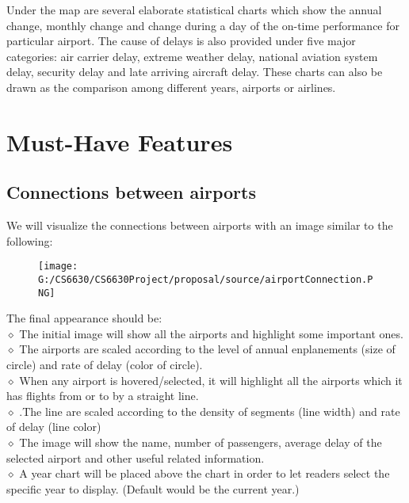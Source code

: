 \documentclass[12pt]{article}
\begin{document}
Under the map are several elaborate statistical charts which show the annual change, monthly change and change during a day of the on-time performance for particular airport. The cause of delays is also provided under five major categories: air carrier delay, extreme weather delay, national aviation system delay, security delay and late arriving aircraft delay. These charts can also be drawn as the comparison among different years, airports or airlines.

\section{Must-Have Features}
    \subsection{Connections between airports}
    We will visualize the connections between airports with an image similar to the following:
    \begin{figure}[H]
      \centering
      \texttt{[image: G:/CS6630/CS6630Project/proposal/source/airportConnection.PNG]}
    \end{figure}
    \noindent The final appearance should be:\\
    $\diamond$ The initial image will show all the airports and highlight some important ones.\\
    $\diamond$ The airports are scaled according to the level of annual enplanements (size of circle) and rate of delay (color of circle).\\
    $\diamond$ When any airport is hovered/selected, it will highlight all the airports which it has flights from or to by a straight line.\\
    $\diamond$ .The line are scaled according to the density of segments (line width) and rate of delay (line color)\\
    $\diamond$ The image will show the name, number of passengers, average delay of the selected airport and other useful related information.\\
    $\diamond$ A year chart will be placed above the chart in order to let readers select the specific year to display. (Default would be the current year.)
\end{document}
